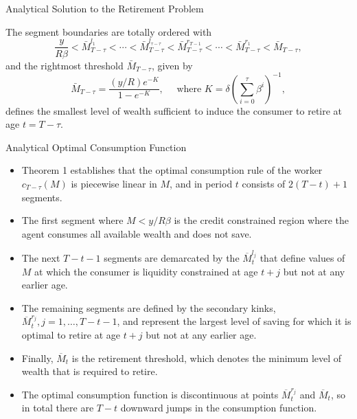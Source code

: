 \documentclass[aspectratio=169]{beamer}
\newcommand{\highlight}[1]{{\color{blue}{#1}}}
\begin{document}
\begin{frame}{Analytical Solution to the Retirement Problem}\footnotesize
	\begin{theorem}
		
		The segment boundaries are totally ordered with 
		\begin{equation}\label{8}
			\frac{y}{R\beta}<\bar{M}_{T-\tau}^{l_1}<\cdots<\bar{M}_{T-\tau}^{l_{\tau-\tau}}<\bar{M}_{T-\tau}^{r_{T-1}}<\cdots<\bar{M}_{T-\tau}^{r_1}<\bar{M}_{T-\tau},
		\end{equation}
		and the rightmost threshold $\bar{M}_{T-\tau}$, given by
		\begin{equation}
			\bar{M}_{T-\tau}=\frac{(y / R) e^{-K}}{1-e^{-K}}, \quad \text { where } K=\delta\left(\sum_{i=0}^\tau \beta^i\right)^{-1},
		\end{equation}
		defines the smallest level of wealth sufficient to induce the consumer to retire at age $t = T - \tau$.

	\end{theorem}
\end{frame}

\begin{frame}{Analytical Optimal Consumption Function}

	\begin{itemize}
		\item Theorem 1 establishes that the optimal consumption rule of the worker $c_{T-\tau}(M)$ is piecewise linear in $M$, and in period $t$ consists of $2(T-t)+1$ segments. 
		\item The first segment where $M<y/R\beta$ is the credit constrained region where the agent consumes all available wealth and does not save.
		\item The next $T-t-1$ segments are demarcated by the \highlight{liquidity constraint kink points} $\overline{M}_t^{l_j}$ that define values of $M$ at which the consumer is liquidity constrained at age $t+j$ but not at any earlier age. 
		\item The remaining segments are defined by the secondary kinks, $\overline{M}_t^{r_j}, j=1, \ldots, T-t-1$, and represent the largest level of saving for which it is optimal to retire at age $t+j$ but not at any earlier age.
		\item Finally, $\overline{M}_t$ is the retirement threshold, which denotes the minimum level of wealth that is required to retire.
		\item The optimal consumption function is discontinuous at points $\overline{M}_t^{r_j}$ and $\overline{M}_t$, so in total there are $T - t$ downward jumps in the consumption function.

	\end{itemize}
	
\end{frame}
\end{document}
